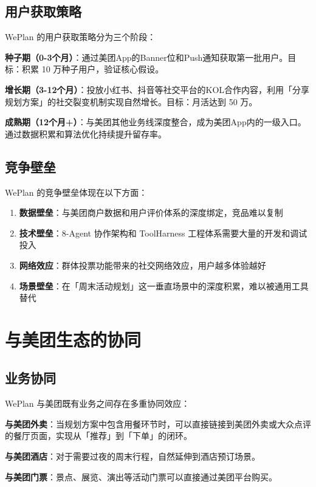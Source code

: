\documentclass[12pt,a4paper]{ctexart}
\begin{document}
\subsection{用户获取策略}

WePlan 的用户获取策略分为三个阶段：

\textbf{种子期（0-3个月）}：通过美团App的Banner位和Push通知获取第一批用户。目标：积累 10 万种子用户，验证核心假设。

\textbf{增长期（3-12个月）}：投放小红书、抖音等社交平台的KOL合作内容，利用「分享规划方案」的社交裂变机制实现自然增长。目标：月活达到 50 万。

\textbf{成熟期（12个月+）}：与美团其他业务线深度整合，成为美团App内的一级入口。通过数据积累和算法优化持续提升留存率。

\subsection{竞争壁垒}

WePlan 的竞争壁垒体现在以下方面：

\begin{enumerate}[leftmargin=2em]
  \item \textbf{数据壁垒}：与美团商户数据和用户评价体系的深度绑定，竞品难以复制
  \item \textbf{技术壁垒}：8-Agent 协作架构和 ToolHarness 工程体系需要大量的开发和调试投入
  \item \textbf{网络效应}：群体投票功能带来的社交网络效应，用户越多体验越好
  \item \textbf{场景壁垒}：在「周末活动规划」这一垂直场景中的深度积累，难以被通用工具替代
\end{enumerate}

\section{与美团生态的协同}

\subsection{业务协同}

WePlan 与美团既有业务之间存在多重协同效应：

\textbf{与美团外卖}：当规划方案中包含用餐环节时，可以直接链接到美团外卖或大众点评的餐厅页面，实现从「推荐」到「下单」的闭环。

\textbf{与美团酒店}：对于需要过夜的周末行程，自然延伸到酒店预订场景。

\textbf{与美团门票}：景点、展览、演出等活动门票可以直接通过美团平台购买。
\end{document}
